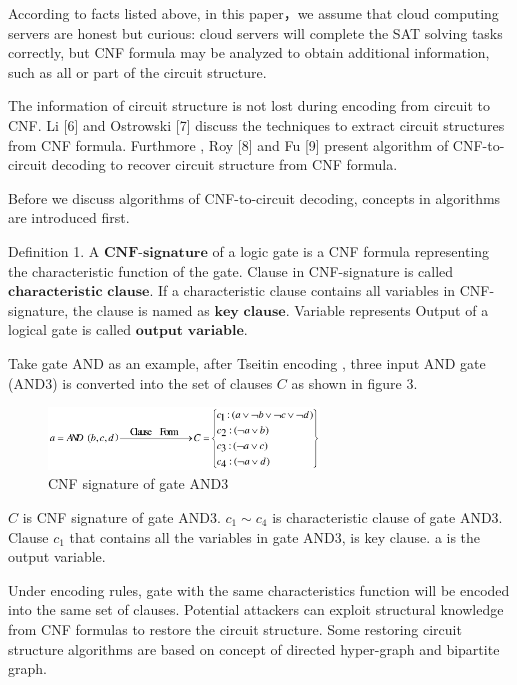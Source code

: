 \documentclass[runningheads,a4paper]{llncs}
\begin{document}
According to facts listed above, in this paper，we assume that cloud computing servers are honest but curious:
cloud servers will complete the SAT solving tasks correctly, but CNF formula may be analyzed to obtain additional information, such as all or part of the circuit structure.

The information of circuit structure is not lost during encoding from circuit to CNF. Li [6] and Ostrowski [7] discuss the techniques to extract circuit structures from CNF formula.
Furthmore , Roy [8] and Fu [9]  present algorithm of CNF-to-circuit decoding to recover circuit structure from CNF formula.

Before we discuss algorithms of CNF-to-circuit decoding, concepts in algorithms are introduced first.  

\noindent \newline Definition 1. A $\mathbf{CNF}$-$\mathbf{signature}$ of a logic gate is a CNF formula representing the characteristic function of the gate.
Clause in CNF-signature is called $\mathbf{characteristic}$ $\mathbf{clause}$.
If a characteristic clause contains all variables in CNF-signature, the clause is named as $\mathbf{key}$ $\mathbf{clause}$.
Variable represents Output of a logical gate is called $\mathbf{output}$ $\mathbf{variable}$.
\setlength{\parindent}{2em} \newline

Take gate AND as an example, after Tseitin encoding , three input AND gate (AND3) is converted into the set of clauses $C$ as shown in figure 3.
\begin{figure}
\centering
\includegraphics[width=7.2cm]{a3}
\caption{CNF signature of gate AND3 }
\end{figure}
$C$ is CNF signature of gate AND3. $c_1 \sim c_4$ is characteristic clause of gate AND3. 
Clause $c_1$ that contains all the variables in gate AND3, is key clause. a is the output variable.

Under encoding rules, gate with the same characteristics function will be encoded into the same set of clauses. 
Potential attackers can exploit structural knowledge from CNF formulas to restore the circuit structure. 
Some restoring circuit structure algorithms are based on concept of directed hyper-graph and bipartite graph.	
\end{document}
